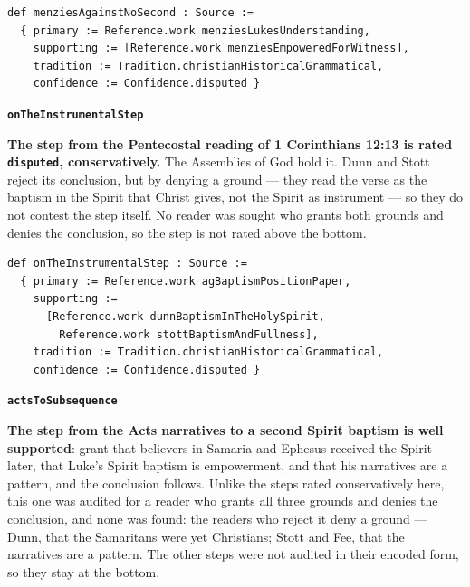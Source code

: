 \documentclass[11pt]{article}
\begin{document}
{\small\begin{verbatim}
def menziesAgainstNoSecond : Source :=
  { primary := Reference.work menziesLukesUnderstanding,
    supporting := [Reference.work menziesEmpoweredForWitness],
    tradition := Tradition.christianHistoricalGrammatical,
    confidence := Confidence.disputed }
\end{verbatim}}
\par\medskip\noindent\textbf{\texttt{on\allowbreak{}The\allowbreak{}Instrumental\allowbreak{}Step}}\par\nobreak\noindent
\textbf{The step from the Pentecostal reading of 1 Corinthians 12:13 is rated \texttt{disputed}, conservatively.} The Assemblies of God hold it. Dunn and Stott reject its conclusion, but by denying a ground — they read the verse as the baptism in the Spirit that Christ gives, not the Spirit as instrument — so they do not contest the step itself. No reader was sought who grants both grounds and denies the conclusion, so the step is not rated above the bottom.

{\small\begin{verbatim}
def onTheInstrumentalStep : Source :=
  { primary := Reference.work agBaptismPositionPaper,
    supporting :=
      [Reference.work dunnBaptismInTheHolySpirit,
        Reference.work stottBaptismAndFullness],
    tradition := Tradition.christianHistoricalGrammatical,
    confidence := Confidence.disputed }
\end{verbatim}}
\par\medskip\noindent\textbf{\texttt{acts\allowbreak{}To\allowbreak{}Subsequence}}\par\nobreak\noindent
\textbf{The step from the Acts narratives to a second Spirit baptism is well supported}: grant that believers in Samaria and Ephesus received the Spirit later, that Luke’s Spirit baptism is empowerment, and that his narratives are a pattern, and the conclusion follows. Unlike the steps rated conservatively here, this one was audited for a reader who grants all three grounds and denies the conclusion, and none was found: the readers who reject it deny a ground — Dunn, that the Samaritans were yet Christians; Stott and Fee, that the narratives are a pattern. The other steps were not audited in their encoded form, so they stay at the bottom.
\end{document}
